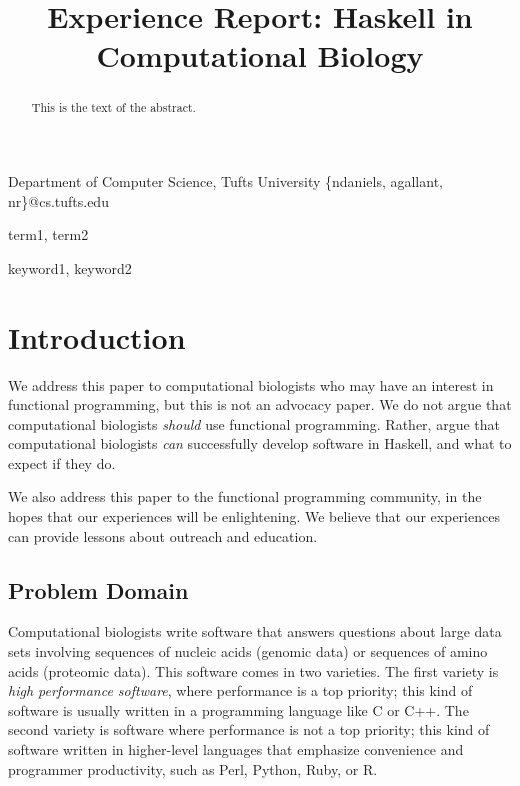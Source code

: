\documentclass[preprint]{sigplanconf}
\begin{document}
\copyrightdata{[to be supplied]} 


\title{Experience Report: Haskell in Computational Biology}

           {Department of Computer Science, Tufts University}
           {\{ndaniels, agallant, nr\}@cs.tufts.edu}


\maketitle

\begin{abstract}
This is the text of the abstract.
\end{abstract}


\terms
term1, term2

\keywords
keyword1, keyword2

\section{Introduction}

We address this paper to computational biologists who may have an interest in 
functional programming, but this is not an advocacy paper. We do not argue that 
computational biologists \textit{should} use functional programming. Rather, 
argue that computational biologists \textit{can} successfully develop software 
in Haskell, and what to expect if they do.

We also address this paper to the functional programming community, in the 
hopes that our experiences will be enlightening. We believe that our 
experiences can provide lessons about outreach and education.


\subsection{Problem Domain}

Computational biologists write software that answers questions about large data 
sets involving sequences of nucleic acids (genomic data) or sequences of amino 
acids (proteomic data). This software comes in two varieties. The first variety 
is \textit{high performance software}, where performance is a top priority; 
this kind of software is usually written in a programming language like C or 
C++. The second variety is software where performance is not a top priority; 
this kind of software written in higher-level languages that emphasize 
convenience and programmer productivity, such as Perl, Python, Ruby, or R.
\end{document}
